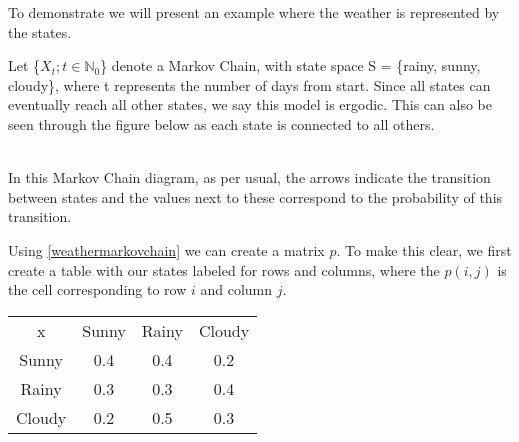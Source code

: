 To demonstrate we will present an example where the weather is represented by the states.  

\begin{example}
\label{weathermarkovchain}
	Let \{$X_t ; t \in \mathbb{N}_0$\} denote a Markov Chain, with state space S = \{rainy, sunny, cloudy\}, where t represents the number of days from start. Since all states can eventually reach all other states, we say this model is ergodic. This can also be seen through the figure below as each state is connected to all others. 
	
	\begin{center}
	\\
    In this Markov Chain diagram, as per usual, the arrows indicate the transition between states and the values next to these correspond to the probability of this transition. 
	\end{center}
\end{example}

Using \ref{weathermarkovchain} we can create a matrix $p$. To make this clear, we first create a table with our states labeled for rows and columns, where the $p(i,j)$ is the cell corresponding to row $i$ and column $j$.

\begin{center}
	\begin{tabular}{c c c c}
		x      & Sunny & Rainy & Cloudy \\
		Sunny  & 0.4   & 0.4   & 0.2 \\
		Rainy  & 0.3   & 0.3   & 0.4 \\ 
		Cloudy & 0.2   & 0.5   & 0.3 
	\end{tabular}
\end{center}

